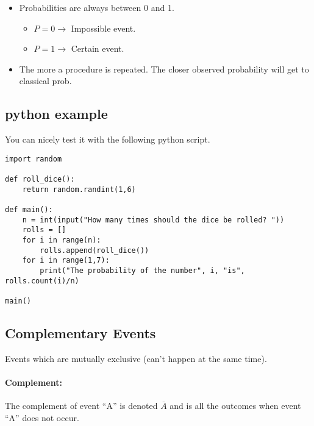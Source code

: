 

\begin{itemize}
    \item Probabilities are always between 0 and 1.
        \begin{itemize}
            \item $P=0 \to$ Impossible event.
            \item $P=1 \to$ Certain event.
        \end{itemize}
    \item The more a procedure is repeated. The closer observed probability will get to classical prob.
\end{itemize}

\subsection{python example}
You can nicely test it with the following python script.
\begin{verbatim}
import random

def roll_dice():
    return random.randint(1,6)

def main():
    n = int(input("How many times should the dice be rolled? "))
    rolls = []
    for i in range(n):
        rolls.append(roll_dice())
    for i in range(1,7):
        print("The probability of the number", i, "is", rolls.count(i)/n)

main()
\end{verbatim}

\subsection{Complementary Events}
Events which are mutually exclusive (can't happen at the same time).

\paragraph{Complement:} The complement of event ``A'' is denoted $\overline{A}$
and is all the outcomes when event ``A'' does not occur.

